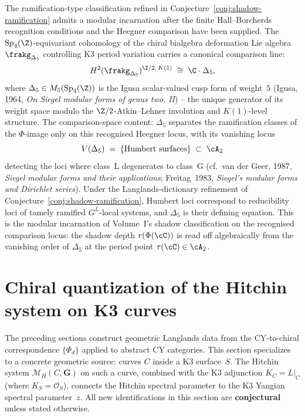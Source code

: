 \begin{remark}
\label{rem:gl-igusa-invariant}
The ramification-type classification refined in Conjecture~\ref{conj:shadow-ramification} admits a modular incarnation after the finite Hall--Borcherds recognition conditions and the Heegner comparison have been supplied. The $\mathrm{Sp}_4(\Z)$-equivariant cohomology of the chiral bialgebra deformation Lie algebra~$\frakg_{\Delta_5}$ controlling K3 period variation carries a canonical comparison line:
\[
 H^2(\frakg_{\Delta_5})^{\Z/2,\,K(1)} \;\cong\; \C \cdot \Delta_5,
\]
where $\Delta_5 \in M_5(\mathrm{Sp}_4(\Z))$ is the Igusa scalar-valued cusp form of weight~$5$ (Igusa, 1964, \emph{On Siegel modular forms of genus two. II}) -- the unique generator of its weight space modulo the $\Z/2$-Atkin--Lehner involution and $K(1)$-level structure. The comparison-space content: $\Delta_5$ separates the ramification classes of the $\Phi$-image only on this recognised Heegner locus, with its vanishing locus
\[
 V(\Delta_5) \;=\; \{\text{Humbert surfaces}\} \;\subset\; \cA_2
\]
detecting the loci where class~L degenerates to class~G (cf.\ van der Geer, 1987, \emph{Siegel modular forms and their applications}; Freitag~1983, \emph{Siegel's modular forms and Dirichlet series}). Under the Langlands-dictionary refinement of Conjecture~\ref{conj:shadow-ramification}, Humbert loci correspond to reducibility loci of tamely ramified $G^L$-local systems, and $\Delta_5$ is their defining equation. This is the modular incarnation of Volume~I's shadow classification on the recognised comparison locus: the shadow depth $r(\Phi(\cC))$ is read off algebraically from the vanishing order of $\Delta_5$ at the period point $\tau(\cC) \in \cA_2$.
\end{remark}


\section{Chiral quantization of the Hitchin system on K3 curves}
\label{sec:chiral-hitchin-k3}

The preceding sections construct geometric Langlands data from the CY-to-chiral correspondence $\{\Phi_d\}$ applied to abstract CY categories. This section specializes to a concrete geometric source: curves $C$ inside a K3 surface~$S$. The Hitchin system $\mathcal{M}_H(C, \mathbf{G})$ on such a curve, combined with the K3 adjunction $K_C = L|_C$ (where $K_S = \mathcal{O}_S$), connects the Hitchin spectral parameter to the K3 Yangian spectral parameter~$z$. All new identifications in this section are \textbf{conjectural} unless stated otherwise.

